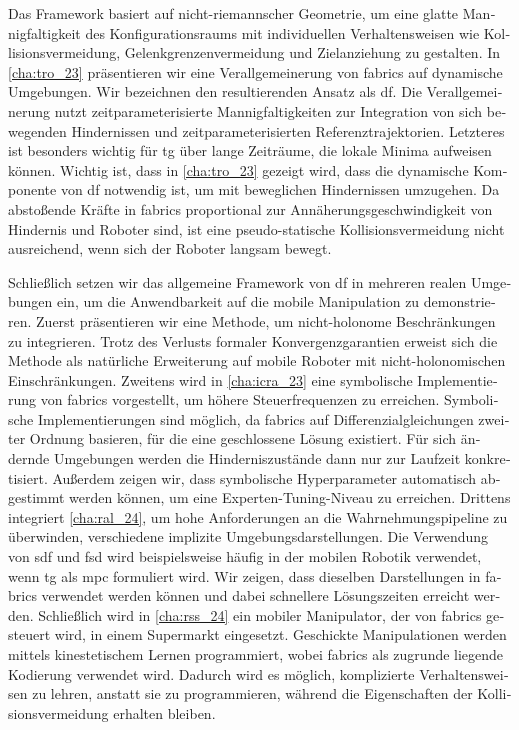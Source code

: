 \begin{otherlanguage}{german}
Das Framework basiert auf nicht-riemannscher Geometrie, um eine glatte
Mannigfaltigkeit des Konfigurationsraums mit individuellen Verhaltensweisen wie
Kollisionsvermeidung, Gelenkgrenzenvermeidung und Zielanziehung zu gestalten. In
\cref{cha:tro_23} präsentieren wir eine Verallgemeinerung von \ac{fabrics} auf
dynamische Umgebungen. Wir bezeichnen den resultierenden Ansatz als \ac{df}. Die
Verallgemeinerung nutzt zeitparameterisierte Mannigfaltigkeiten zur Integration
von sich bewegenden Hindernissen und zeitparameterisierten Referenztrajektorien.
Letzteres ist besonders wichtig für \ac{tg} über lange Zeiträume, die lokale Minima
aufweisen können. Wichtig ist, dass in \cref{cha:tro_23} gezeigt wird, dass die
dynamische Komponente von \ac{df} notwendig ist, um mit beweglichen Hindernissen
umzugehen. Da abstoßende Kräfte in \ac{fabrics} proportional zur
Annäherungsgeschwindigkeit von Hindernis und Roboter sind, ist eine
pseudo-statische Kollisionsvermeidung nicht ausreichend, wenn sich der Roboter
langsam bewegt.

Schließlich setzen wir das allgemeine Framework von \ac{df} in mehreren realen
Umgebungen ein, um die Anwendbarkeit auf die mobile Manipulation zu
demonstrieren. Zuerst präsentieren wir eine Methode, um nicht-holonome
Beschränkungen zu integrieren. Trotz des Verlusts formaler
Konvergenzgarantien erweist sich die Methode als natürliche Erweiterung auf
mobile Roboter mit nicht-holonomischen Einschränkungen. Zweitens wird in
\cref{cha:icra_23} eine symbolische Implementierung von \ac{fabrics}
vorgestellt, um höhere Steuerfrequenzen zu erreichen. Symbolische
Implementierungen sind möglich, da \ac{fabrics} auf
Differenzialgleichungen zweiter Ordnung basieren, für die eine geschlossene
Lösung existiert. Für sich ändernde Umgebungen werden die Hinderniszustände dann
nur zur Laufzeit konkretisiert. Außerdem zeigen wir, dass symbolische
Hyperparameter automatisch abgestimmt werden können, um eine
Experten-Tuning-Niveau zu erreichen. Drittens integriert \cref{cha:ral_24}, um
hohe Anforderungen an die Wahrnehmungspipeline zu überwinden, verschiedene
implizite Umgebungsdarstellungen. Die Verwendung von \ac{sdf} und
\ac{fsd} wird beispielsweise häufig in der mobilen Robotik verwendet, wenn
\ac{tg} als \ac{mpc} formuliert wird. Wir zeigen, dass dieselben Darstellungen
in \ac{fabrics} verwendet werden können und dabei schnellere Lösungszeiten
erreicht werden. Schließlich wird in \cref{cha:rss_24} ein mobiler Manipulator,
der von \ac{fabrics} gesteuert wird, in einem Supermarkt eingesetzt. Geschickte
Manipulationen werden mittels kinestetischem Lernen
programmiert, wobei
\ac{fabrics} als zugrunde liegende Kodierung verwendet wird. Dadurch wird es
möglich, komplizierte Verhaltensweisen zu lehren, anstatt sie zu programmieren,
während die Eigenschaften der Kollisionsvermeidung erhalten bleiben.


\end{otherlanguage}
